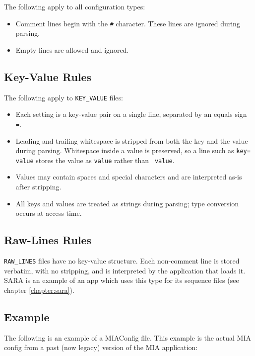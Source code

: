 The following apply to all configuration types:

\begin{itemize}\itemsep0em
	\item Comment lines begin with the \texttt{\#} character. These lines are ignored during parsing.
	\item Empty lines are allowed and ignored.
\end{itemize}

\subsection*{Key-Value Rules}

The following apply to \texttt{KEY\_VALUE} files:

\begin{itemize}\itemsep0em
	\item Each setting is a key-value pair on a single line, separated by an equals sign \texttt{=}.
	\item Leading and trailing whitespace is stripped from both the key and the value during parsing. Whitespace inside a value is preserved, so a line such as \texttt{key= value} stores the value as \texttt{value} rather than \texttt{ value}.
	\item Values may contain spaces and special characters and are interpreted as-is after stripping.
	\item All keys and values are treated as strings during parsing; type conversion occurs at access time.
\end{itemize}

\subsection*{Raw-Lines Rules}

\texttt{RAW\_LINES} files have no key-value structure. Each non-comment line is stored verbatim, with no stripping, and is interpreted by the application that loads it. SARA is an example of an app which uses this type for its sequence files (see chapter \ref{chapter:sara}).

\subsection*{Example}

The following is an example of a MIAConfig file. This example is the actual MIA config from a past (now legacy) version of the MIA application:


